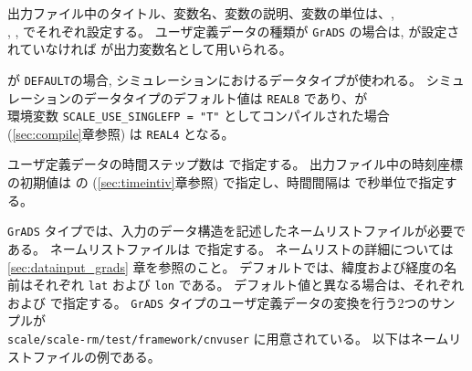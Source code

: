 出力ファイル中のタイトル、変数名、変数の説明、変数の単位は、, \\
, ,  でそれぞれ設定する。
ユーザ定義データの種類が \verb|GrADS| の場合は,  が設定されていなければ  が出力変数名として用いられる。

 が \verb|DEFAULT|の場合, シミュレーションにおけるデータタイプが使われる。
シミュレーションのデータタイプのデフォルト値は \verb|REAL8| であり、\scalerm が \\
環境変数 \verb|SCALE_USE_SINGLEFP = "T"| としてコンパイルされた場合 (\ref{sec:compile}章参照) は \verb|REAL4| となる。


ユーザ定義データの時間ステップ数は  で指定する。
出力ファイル中の時刻座標の初期値は  の  (\ref{sec:timeintiv}章参照) で指定し、時間間隔は  で秒単位で指定する。


\verb|GrADS| タイプでは、入力のデータ構造を記述したネームリストファイルが必要である。
ネームリストファイルは  で指定する。
ネームリストの詳細については \ref{sec:datainput_grads} 章を参照のこと。
デフォルトでは、緯度および経度の名前はそれぞれ \verb|lat| および \verb|lon| である。
デフォルト値と異なる場合は、それぞれ  および  で指定する。
\verb|GrADS| タイプのユーザ定義データの変換を行う2つのサンプルが \\
\verb|scale/scale-rm/test/framework/cnvuser| に用意されている。
以下はネームリストファイルの例である。



